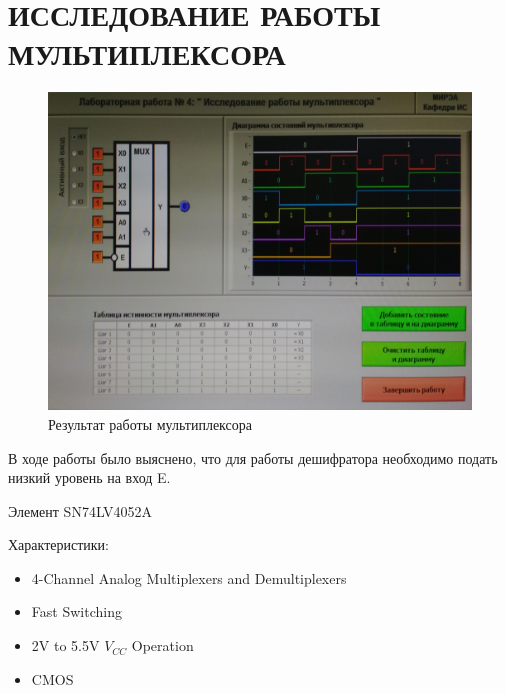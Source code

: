 \section{ИССЛЕДОВАНИЕ РАБОТЫ МУЛЬТИПЛЕКСОРА}

\begin{figure}[H]
	\centering
	\includegraphics[width=0.95\linewidth]{imgs/4/1}
	\caption{Результат работы мультиплексора}
	\label{fig:3_}
\end{figure}

В ходе работы было выяснено, что для работы дешифратора необходимо подать низкий уровень на вход E.

Элемент SN74LV4052A

Характеристики:
\begin{itemize}
	\item 4-Channel Analog Multiplexers and Demultiplexers
	\item Fast Switching
	\item 2V to 5.5V $V_{CC}$ Operation
	\item CMOS
\end{itemize}